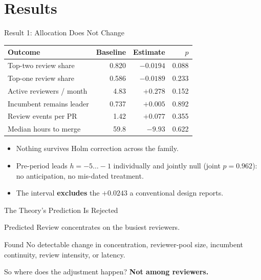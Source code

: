 \section{Results}

\begin{frame}{Result 1: Allocation Does Not Change}
\begin{center}\small
\begin{tabular}{lrrr}
\toprule
Outcome & Baseline & Estimate & $p$\\
\midrule
Top-two review share & 0.820 & $-0.0194$ & 0.088\\
Top-one review share & 0.586 & $-0.0189$ & 0.233\\
Active reviewers / month & 4.83 & $+0.278$ & 0.152\\
Incumbent remains leader & 0.737 & $+0.005$ & 0.892\\
Review events per PR & 1.42 & $+0.077$ & 0.355\\
Median hours to merge & 59.8 & $-9.93$ & 0.622\\
\bottomrule
\end{tabular}
\end{center}
\vfill
\begin{itemize}\small
  \item Nothing survives Holm correction across the family.
  \item Pre-period leads $h=-5\ldots-1$ individually and jointly null
        (joint $p=0.962$): no anticipation, no mis-dated treatment.
  \item The interval \textbf{excludes} the $+0.0243$ a conventional design
        reports.
\end{itemize}
\end{frame}

\begin{frame}{The Theory's Prediction Is Rejected}
\begin{alertblock}{Predicted}
  Review concentrates on the busiest reviewers.
\end{alertblock}
\begin{exampleblock}{Found}
  No detectable change in concentration, reviewer-pool size, incumbent
  continuity, review intensity, or latency.
\end{exampleblock}
\vfill
So where does the adjustment happen? \textbf{Not among reviewers.}
\end{frame}

